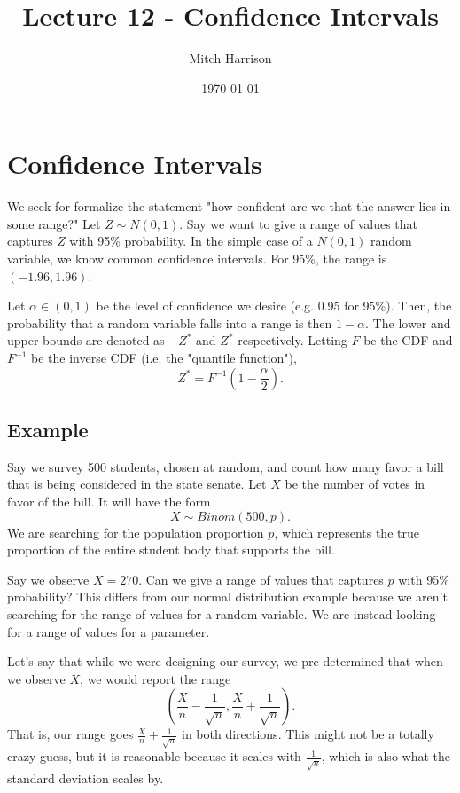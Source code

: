 \documentclass[titlepage, 12pt, leqno]{article}
\title{\Huge{Lecture 12 - Confidence Intervals}}
\author{\large{Mitch Harrison}}
\date{\today}
\begin{document}
\setlength{\parskip}{1\baselineskip}
\setlength{\parindent}{15pt}
\maketitle
\tableofcontents
\newpage


\section{Confidence Intervals}

We seek for formalize the statement "how confident are we that the answer lies
in some range?" Let $Z \sim N(0,1)$. Say we want to give a range of values that
captures $Z$ with 95\% probability. In the simple case of a $N(0,1)$ random
variable, we know common confidence intervals. For 95\%, the range is 
$(-1.96,1.96)$.

Let $\alpha \in (0,1)$ be the level of confidence we desire (e.g. 0.95 for 95\%).
Then, the probability that a random variable falls into a range is then
$1-\alpha$. The lower and upper bounds are denoted as $-Z^{*}$ and $Z^{*}$
respectively. Letting $F$ be the CDF and $F^{-1}$ be the inverse CDF (i.e. the
"quantile function"),
\[
    Z^{*} = F^{-1}\left(1-\frac{\alpha}{2}\right).
\]
\subsection{Example}
Say we survey 500 students, chosen at random, and count how many favor a bill
that is being considered in the state senate. Let $X$ be the number of votes
in favor of the bill. It will have the form
\[
    X \sim Binom(500, p).
\]
We are searching for the population proportion $p$, which represents the true
proportion of the entire student body that supports the bill.

Say we observe $X=270$. Can we give a range of values that captures $p$ with
95\% probability? This differs from our normal distribution example because we
aren't searching for the range of values for a random variable. We are instead
looking for a range of values for a parameter.

Let's say that while we were designing our survey, we pre-determined that when
we observe $X$, we would report the range
\[
\left(\frac{X}{n}-\frac{1}{\sqrt{n}}, \frac{X}{n} + \frac{1}{\sqrt{n}}\right).
\]
That is, our range goes $\frac{X}{n} + \frac{1}{\sqrt{n}}$ in both directions.
This might not be a totally crazy guess, but it is reasonable because it scales
with $\frac{1}{\sqrt{n}}$, which is also what the standard deviation scales by.
\end{document}
